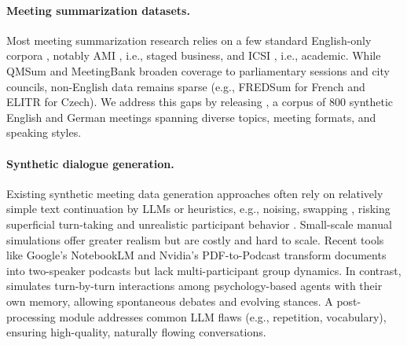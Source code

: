 \noindent
\paragraph{Meeting summarization datasets.}
Most meeting summarization research relies on a few standard English-only corpora \cite{KirsteinWGR25}, notably AMI \cite{MccowanCKA05}, i.e., staged business, and ICSI \cite{JaninBEE03}, i.e., academic.
While QMSum \cite{ZhongYYZ21h} and MeetingBank \cite{HuGDD23a} broaden coverage to parliamentary sessions and city councils, non-English data remains sparse (e.g., FREDSum \cite{RennardSGH23a} for French and ELITR \cite{NedoluzhkoSHG22} for Czech).
We address this gaps by releasing \dataset{}, a corpus of 800 synthetic English and German meetings spanning diverse topics, meeting formats, and speaking styles.


\paragraph{Synthetic dialogue generation.}
Existing synthetic meeting data generation approaches often rely on relatively simple text continuation by LLMs \cite{QiuP24} or heuristics, e.g., noising, swapping \cite{ChenY21, ParkSL22, LiuMSN22}, risking superficial turn-taking and unrealistic participant behavior \cite{KirsteinWGR25}.
Small-scale manual simulations \cite{ThulkeGJD24} offer greater realism but are costly and hard to scale.
Recent tools like Google’s NotebookLM \cite{google-2024} and Nvidia’s PDF-to-Podcast \cite{nvidia-2025} transform documents into two-speaker podcasts but lack multi-participant group dynamics.
In contrast, \pipeline{} simulates turn-by-turn interactions among psychology-based agents with their own memory, allowing spontaneous debates and evolving stances. 
A post-processing module addresses common LLM flaws (e.g., repetition, vocabulary), ensuring high-quality, naturally flowing conversations.

